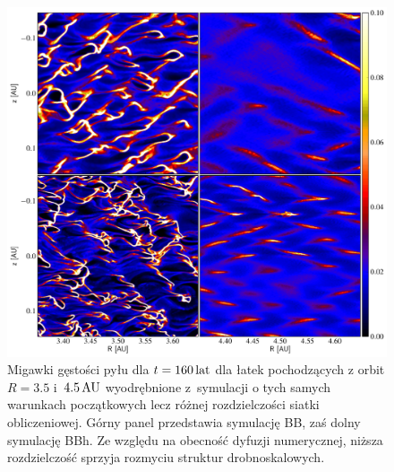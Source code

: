 \begin{figure}
   \includegraphics[width=0.98\linewidth]{figures/fig10}
   \caption[Test zbieżności symulacji BB, BBh.]
     {Migawki gęstości pyłu dla $t = 160\hbox{$\thinspace\textrm{lat}$}$ dla łatek pochodzących z
      orbit $R=3.5$ i~$4.5\hbox{$\thinspace\textrm{AU}$}$ wyodrębnione z~symulacji o tych samych warunkach
      początkowych lecz różnej rozdzielczości siatki obliczeniowej. Górny panel
      przedstawia symulację BB, zaś dolny symulację BBh. Ze względu na obecność
      dyfuzji numerycznej, niższa rozdzielczość sprzyja rozmyciu struktur
      drobnoskalowych.}
   \label{fig10} 
\end{figure}

